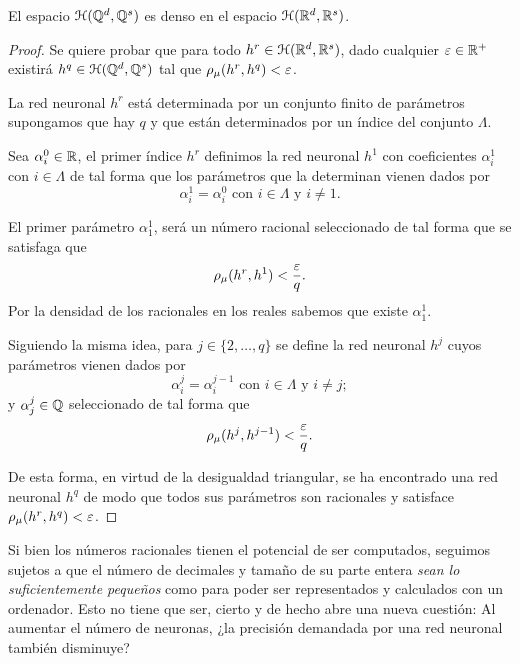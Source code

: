 \begin{aportacionOriginal}
    \begin{teorema}\label{teo:densidad-racional}
        El espacio $\mathcal{H}(\mathbb{Q}^d, \mathbb{Q}^s)$ es denso en el espacio $\mathcal{H}(\mathbb{R}^d,\mathbb{R}^s)$. 
    \end{teorema}
    \begin{proof}
        Se quiere probar que para todo $h^r \in \mathcal{H}(\mathbb{R}^d,\mathbb{R}^s)$,
         dado cualquier $\varepsilon \in \mathbb{R}^+$  
        existirá $h^q \in \mathcal{H}(\mathbb{Q}^d, \mathbb{Q}^s)$ tal que 
        $\rho_{\mu}( h^r, h^q) < \varepsilon$. 

        La red neuronal $h^r$ está determinada por un conjunto finito
        de parámetros supongamos que hay $q$ y que están determinados por un índice del conjunto $\Lambda$. 

        Sea $\alpha^0_i \in \mathbb{R}$, el primer índice $h^r$ definimos la red neuronal $h^1$ con coeficientes  $\alpha^1_i$ con $i\in \Lambda$
        de tal forma que los parámetros que la determinan vienen dados por
        \begin{equation*}
            \alpha^1_i = \alpha^0_i 
            \text{ con } i \in \Lambda
            \text{ y } i \neq 1.
        \end{equation*}

        El primer parámetro $\alpha^1_1$, será un número racional 
        seleccionado de tal forma que se satisfaga que 
        \begin{equation*}
            \rho_{\mu}( h^r, h^1) < \frac{\varepsilon}{q}.
        \end{equation*}
        Por la densidad de los racionales en los reales sabemos que  existe $\alpha^1_1$.

        Siguiendo la misma idea, para $j \in \{2,\ldots, q\}$ se define la red neuronal 
        $h^j$ cuyos parámetros vienen dados por 
        \begin{equation*}
            \alpha^j_i = \alpha^{j-1}_i 
            \text{ con } i \in \Lambda
            \text{ y } i \neq j;
        \end{equation*}
        y $\alpha^j_j \in \mathbb{Q}$ seleccionado de tal forma que  
        \begin{equation*}
            \rho_{\mu}( h^j, h^{j-1}) < \frac{\varepsilon}{q}.
        \end{equation*}

        De esta forma, en virtud de la desigualdad triangular,  se ha 
        encontrado una red neuronal $h^q$
        de modo que todos sus parámetros son racionales y 
        satisface 
        $\rho_{\mu}( h^r, h^q) < \varepsilon$.
    \end{proof}

    Si bien los números racionales tienen el potencial de ser computados, seguimos sujetos a que el número de decimales y tamaño de su parte entera \textit{sean lo suficientemente pequeños} como para poder ser representados 
    y calculados con un ordenador. Esto no tiene que ser, cierto y de hecho abre una nueva cuestión:
     Al aumentar el número de neuronas, ¿la precisión demandada por una red neuronal también disminuye?  
\end{aportacionOriginal} 

